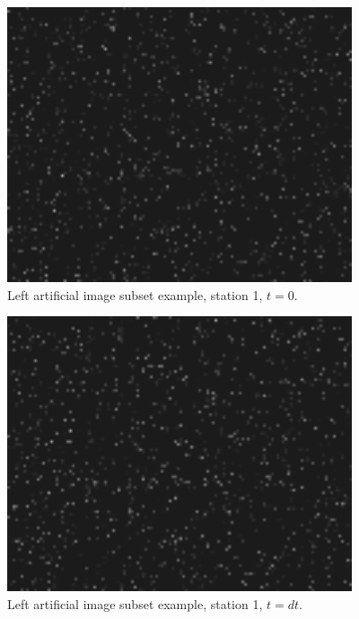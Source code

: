 \vspace{32pt}
\begin{figure}[H]
	\centering
	\includegraphics[width=4in]{figs/artificial_images/la}
	\caption{Left artificial image subset example, station 1, $t=0$.}
	\label{fig:la}
\end{figure}

\begin{figure}[H]
	\centering
	\includegraphics[width=4in]{figs/artificial_images/lb}
	\caption{Left artificial image subset example, station 1, $t=dt$.}
	\label{fig:lb}
\end{figure}

\makeatletter
{}
\makeatother

